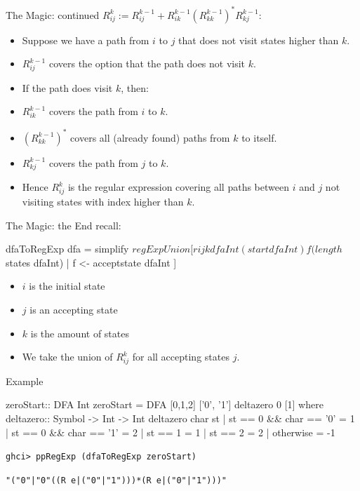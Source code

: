 \begin{frame}[fragile]{The Magic: continued}
	$R^{k}_{i j} := R^{k-1}_{ij}+R^{k-1}_{ik}(R^{k-1}_{kk})^*R^{k-1}_{kj}$:
	\begin{itemize}
		\item Suppose we have a path from $i$ to $j$ that does not visit states higher than $k$.
		\item $R^{k-1}_{ij}$ covers the option that the path does not visit $k$.
		\item If the path does visit $k$, then:
		\item $R^{k-1}_{ik}$ covers the path from $i$ to $k$.
		\item $(R^{k-1}_{kk})^*$ covers all (already found) paths from $k$ to itself.
		\item $R^{k-1}_{kj}$ covers the path from $j$ to $k$.\pause
		\item Hence $R^{k}_{ij}$ is the regular expression covering all paths between $i$ and $j$ not visiting states with index higher than $k$.
	\end{itemize}
\end{frame}
\begin{frame}[fragile]{The Magic: the End}
recall:
\begin{code}
dfaToRegExp dfa = simplify $ regExpUnion [rijk dfaInt (start dfaInt) f (length $ states dfaInt) | f <- acceptstate dfaInt ]
\end{code}
\begin{itemize}
	\item $i$ is the initial state
	\item $j$ is an accepting state
	\item $k$ is the amount of states
	\item We take the union of $R^k_{ij}$ for all accepting states $j$.
\end{itemize}
\end{frame}
\begin{frame}[fragile]{Example}
	\begin{code}
zeroStart:: DFA Int
zeroStart = DFA [0,1,2] ['0', '1'] deltazero 0 [1] where
	deltazero:: Symbol -> Int -> Int
	deltazero char st
	| st == 0 && char == '0' = 1
	| st == 0 && char == '1' = 2
	| st == 1 = 1
	| st == 2 = 2
	| otherwise = -1
	\end{code}

\texttt{ghci> ppRegExp (dfaToRegExp zeroStart)}

\texttt{"("0"|"0"((R e|("0"|"1")))*(R e|("0"|"1")))"}

\end{frame}